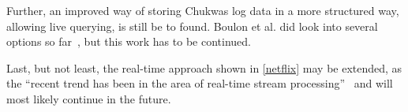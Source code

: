 Further, an improved way of storing Chukwas log data in a more structured way, allowing live querying, is still be to found. Boulon et al. did look into several options so far~\cite{Boulonb}, but this work has to be continued.

Last, but not least, the real-time approach shown in \ref{netflix} may be extended, as the ``recent trend has been in the area of real-time stream processing''~\cite{Bae2013} and will most likely continue in the future.